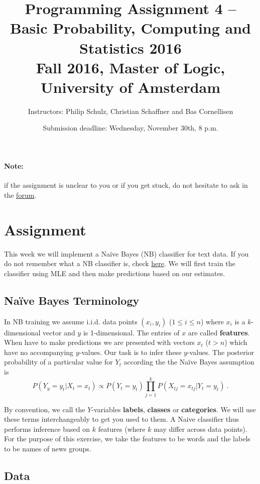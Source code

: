 \documentclass[11pt, leqno, a4paper]{article}
\title{Programming Assignment 4 -- Basic Probability, Computing and Statistics 2016 \\[2mm]
\large{Fall 2016, Master of Logic, University of Amsterdam}}
\author{Instructors: Philip Schulz, Christian Schaffner and Bas Cornellisen}
\date{Submission deadline: Wednesday, November 30th, 8 p.m.}
\begin{document}
\maketitle

\paragraph{Note:} if the assignment is unclear to you or if you get
stuck, do not hesitate to ask in the
\href{https://www.moodle.ch/lms/mod/forum/view.php?id=1721}{forum}.

\section{Assignment}

This week we will implement a Na\"ive Bayes (NB) classifier for text data. If you do not remember what a 
NB classifier is, check \href{https://github.com/BasicProbability/LectureNotes/blob/master/chapter4/chapter4.pdf}{here}. 
We will first train the classifier using MLE and then make predictions based on our estimates.

\subsection{Na\"ive Bayes Terminology}

In NB training we assume i.i.d. data points $ (x_{i},y_{i}) $ ($ 1 \leq i \leq n $) where $ x_{i} $ is a $ k $-dimensional vector and
$ y $ is 1-dimensional. The entries of $ x $ are called \textbf{features}. When have to make predictions we are presented with vectors
$ x_{t} $ ($ t > n $) which have no accompanying $ y $-values. Our task is to infer these $ y $-values. The posterior probability of a particular value
for $ Y_{t} $ according the the Na\"ive Bayes assumption is
\begin{equation}
P(Y_{y} = y_{t}|X_{t} = x_{t}) \propto P(Y_{t} = y_{t}) \prod_{j=1}^{k}P(X_{tj} = x_{tj}|Y_{t} = y_{t}) \ .
\end{equation}

By convention, we call the $ Y $-variables \textbf{labels}, \textbf{classes} or \textbf{categories}. We will use these terms interchangeably to get you used
to them. A Naive classifier thus performs inference based on $ k $ features (where $ k $ may differ across data points). For the purpose of this exercise, we take the 
features to be words and the labels to be names of news groups.

\subsection{Data}
\end{document}
